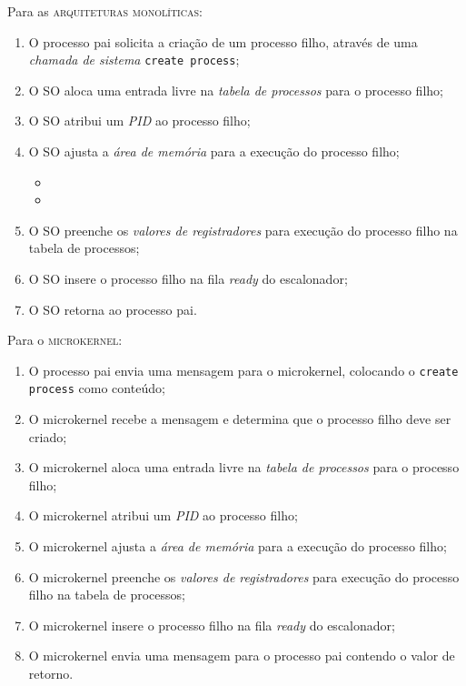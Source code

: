Para as \textsc{arquiteturas monolíticas}:
\begin{enumerate}
  \item O processo pai solicita a criação de um processo filho, através de uma \textit{chamada de sistema} \texttt{create process};

  \item O SO aloca uma entrada livre na \textit{tabela de processos} para o processo filho;

  \item O SO atribui um \textit{PID} ao processo filho;

  \item O SO ajusta a \textit{área de memória} para a execução do processo filho;
  \begin{itemize}
    \item %
    \item %
  \end{itemize}

  \item O SO preenche os \textit{valores de registradores} para execução do processo filho na tabela de processos;

  \item O SO insere o processo filho na fila \textit{ready} do escalonador;

  \item O SO retorna ao processo pai.
\end{enumerate}

Para o \textsc{microkernel}:
\begin{enumerate}
  \item O processo pai envia uma mensagem para o microkernel, colocando o \texttt{create process} como conteúdo;

  \item O microkernel recebe a mensagem e determina que o processo filho deve ser criado;

  \item O microkernel aloca uma entrada livre na \textit{tabela de processos} para o processo filho;

  \item O microkernel atribui um \textit{PID} ao processo filho;

  \item O microkernel ajusta a \textit{área de memória} para a execução do processo filho;

  \item O microkernel preenche os \textit{valores de registradores} para execução do processo filho na tabela de processos;

  \item O microkernel insere o processo filho na fila \textit{ready} do escalonador;

  \item O microkernel envia uma mensagem para o processo pai contendo o valor de retorno.
\end{enumerate}

